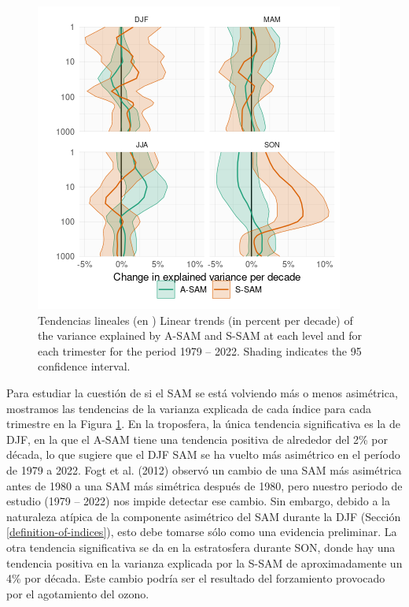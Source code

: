\documentclass[12pt,oneside]{reedthesis}
\begin{document}
\begin{figure}
\includegraphics{figures/30-sam/r-squared-trend-1} \caption{Tendencias lineales (en )
Linear trends (in percent per decade) of the variance explained by A-SAM and S-SAM at each level and for each trimester for the period 1979 -- 2022.
Shading indicates the 95 confidence interval.}\label{fig:r-squared-trend}
\end{figure}


Para estudiar la cuestión de si el SAM se está volviendo más o menos asimétrica, mostramos las tendencias de la varianza explicada de cada índice para cada trimestre en la Figura \ref{fig:r-squared-trend}.
En la troposfera, la única tendencia significativa es la de DJF, en la que el A-SAM tiene una tendencia positiva de alrededor del 2\% por década, lo que sugiere que el DJF SAM se ha vuelto más asimétrico en el período de 1979 a 2022.
Fogt et al. (2012) observó un cambio de una SAM más asimétrica antes de 1980 a una SAM más simétrica después de 1980, pero nuestro periodo de estudio (1979 -- 2022) nos impide detectar ese cambio.
Sin embargo, debido a la naturaleza atípica de la componente asimétrico del SAM durante la DJF (Sección \ref{definition-of-indices}), esto debe tomarse sólo como una evidencia preliminar.
La otra tendencia significativa se da en la estratosfera durante SON, donde hay una tendencia positiva en la varianza explicada por la S-SAM de aproximadamente un 4\% por década.
Este cambio podría ser el resultado del forzamiento provocado por el agotamiento del ozono.
\end{document}
